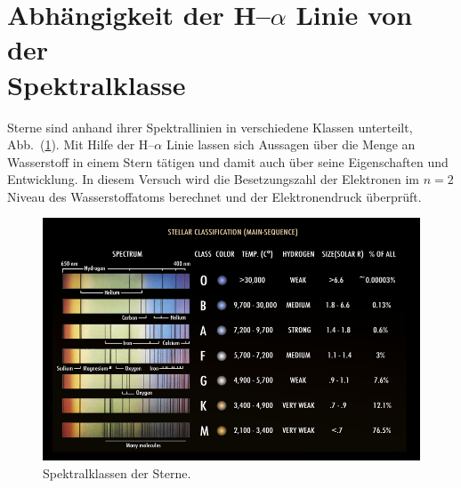 \section{Abhängigkeit der H--$\alpha $ Linie von der\\Spektralklasse}
Sterne sind anhand ihrer Spektrallinien in verschiedene Klassen unterteilt, Abb.\ (\ref{fig:spektralklasse}).
Mit Hilfe der H--$\alpha $ Linie lassen sich Aussagen über die Menge an Wasserstoff in einem Stern tätigen und damit auch über seine Eigenschaften und Entwicklung.
In diesem Versuch wird die Besetzungszahl der Elektronen im $n=2$ Niveau des Wasserstoffatoms berechnet und der Elektronendruck überprüft.

\begin{figure}[t]
  \centering
  \includegraphics[width=.5\textwidth]{464_stellar_classification_chart.png}
  \caption{Spektralklassen der Sterne.\cite{wikipediaSpektralklasse}} \label{fig:spektralklasse}
\end{figure}
